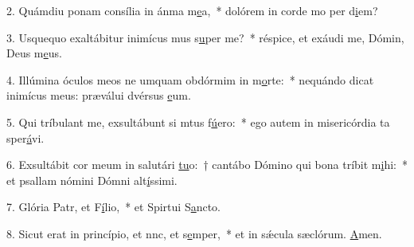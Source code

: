 2. Quámdiu ponam consília in ánma m\uline{e}a,~* dolórem in corde mo per d\uline{i}em?\par 
3. Usquequo exaltábitur inimícus mus s\uline{u}per me?~* réspice, et exáudi me, Dómin, Deus m\uline{e}us.\par 
4. Illúmina óculos meos ne umquam obdórmim in m\uline{o}rte:~* nequándo dicat inimícus meus: præválui dvérsus \uline{e}um.\par 
5. Qui tríbulant me, exsultábunt si mtus f\uline{ú}ero:~* ego autem in misericórdia ta sper\uline{á}vi.\par 
6. Exsultábit cor meum in salutári \uline{tu}o:~† cantábo Dómino qui bona tríbit m\uline{i}hi:~* et psallam nómini Dómni alt\uline{í}ssimi.\par 
7. Glória Patr, et F\uline{í}lio,~* et Spirtui S\uline{a}ncto.\par 
8. Sicut erat in princípio, et nnc, et s\uline{e}mper,~* et in sǽcula sæclórum. \uline{A}men.\par 
